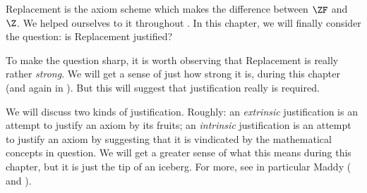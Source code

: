 \documentclass[../../../include/open-logic-section]{subfiles}
\begin{document}

Replacement is the axiom scheme which makes the difference between $\ZF$
and~$\Z$. We helped ourselves to it throughout
. In this chapter, we
will finally consider the question: is Replacement justified? 

To make the question sharp, it is worth observing that Replacement is really
rather \emph{strong}. We will get a sense of just how strong it is, during this chapter (and again in ). But this will suggest that justification really is required. 

We will discuss two kinds of justification. Roughly: an \emph{extrinsic} justification is an attempt to justify an axiom by its fruits; an \emph{intrinsic} justification is an attempt to justify an axiom by suggesting that it is vindicated by the mathematical concepts in question. We will get a greater sense of what this means during this chapter, but it is just the tip of an iceberg. For more, see in particular Maddy (\cite{Maddy1988a} and \cite{Maddy1988b}).
\end{document}
